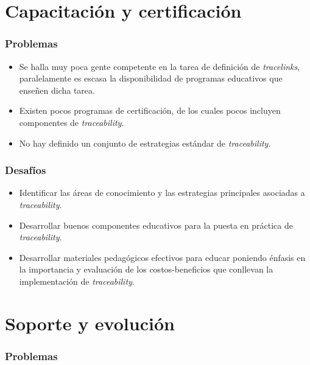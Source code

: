 \documentclass[a4paper,12pt,twoside,spanish,openright]{book}
\begin{document}
\section{Capacitación y certificación}

\subsubsection{Problemas}

\begin{itemize}[label={$\times$}]
\item Se halla muy poca gente competente en la tarea de definición de \textit{tracelinks}, paralelamente es escasa la disponibilidad de programas educativos que enseñen dicha tarea.

\item Existen pocos programas de certificación, de los cuales pocos incluyen componentes de \textit{traceability}.

\item No hay definido un conjunto de estrategias estándar de \textit{traceability}.

\end{itemize}

\subsubsection{Desafíos}

\begin{itemize}[label={\checkmark}]
\item Identificar las áreas de conocimiento y las estrategias principales asociadas a \textit{traceability}.

\item Desarrollar buenos componentes educativos para la puesta en práctica de \textit{traceability}.

\item Desarrollar materiales pedagógicos efectivos para educar poniendo énfasis  en la importancia y evaluación de los costos-beneficios que conllevan la implementación de \textit{traceability}.

\end{itemize}

\section{Soporte y evolución}

\subsubsection{Problemas}
\end{document}
